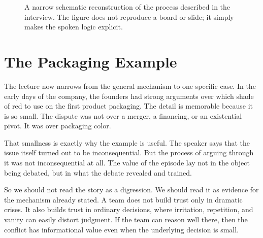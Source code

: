 \begin{figure}[h]
\centering
{}
\caption{A narrow schematic reconstruction of the process described in the interview. The figure does not reproduce a board or slide; it simply makes the spoken logic explicit.}
\end{figure}

\section{The Packaging Example}

The lecture now narrows from the general mechanism to one specific case. In the early days of the company, the founders had strong arguments over which shade of red to use on the first product packaging. The detail is memorable because it is so small. The dispute was not over a merger, a financing, or an existential pivot. It was over packaging color.

That smallness is exactly why the example is useful. The speaker says that the issue itself turned out to be inconsequential. But the process of arguing through it was not inconsequential at all. The value of the episode lay not in the object being debated, but in what the debate revealed and trained.

So we should not read the story as a digression. We should read it as evidence for the mechanism already stated. A team does not build trust only in dramatic crises. It also builds trust in ordinary decisions, where irritation, repetition, and vanity can easily distort judgment. If the team can reason well there, then the conflict has informational value even when the underlying decision is small.

